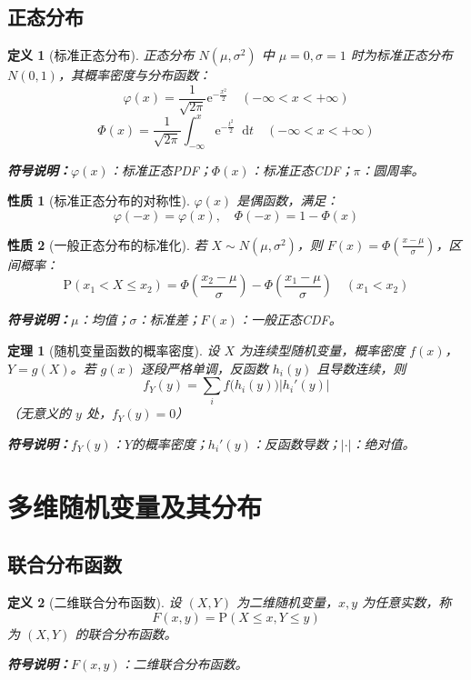 \documentclass{article}
\newcommand{\Prob}{\mathrm{P}}
\newcommand{\dif}{\mathop{}\!\mathrm{d}}
\newcommand{\e}{\mathrm{e}}
\newcommand{\symnote}[1]{\par\noindent\textbf{符号说明：}#1\par}
\theoremstyle{mytheorem}
\newtheorem{theorem}{定理}[section]
\newtheorem{definition}{定义}[section]
\newtheorem{property}{性质}[section]
\begin{document}
\subsection{正态分布}
\begin{definition}[标准正态分布]
正态分布 $N(\mu,\sigma^2)$ 中 $\mu=0, \sigma=1$ 时为标准正态分布 $N(0,1)$，其概率密度与分布函数：
$$
\varphi(x)=\frac{1}{\sqrt{2\pi}} \e^{-\frac{x^2}{2}} \quad (-\infty < x < +\infty)
$$
$$
\Phi(x)=\frac{1}{\sqrt{2\pi}} \int_{-\infty}^{x} \e^{-\frac{t^2}{2}} \dif t \quad (-\infty < x < +\infty)
$$
\symnote{$\varphi(x)$：标准正态PDF；$\Phi(x)$：标准正态CDF；$\pi$：圆周率。}
\end{definition}

\begin{property}[标准正态分布的对称性]
$\varphi(x)$ 是偶函数，满足：
$$
\varphi(-x)=\varphi(x), \quad \Phi(-x)=1-\Phi(x)
$$
\end{property}

\begin{property}[一般正态分布的标准化]
若 $X \sim N(\mu,\sigma^2)$，则 $F(x)=\Phi\left( \frac{x-\mu}{\sigma} \right)$，区间概率：
$$
\Prob(x_1 < X \leq x_2)=\Phi\left( \frac{x_2-\mu}{\sigma} \right)-\Phi\left( \frac{x_1-\mu}{\sigma} \right) \quad (x_1 < x_2)
$$
\symnote{$\mu$：均值；$\sigma$：标准差；$F(x)$：一般正态CDF。}
\end{property}

\begin{theorem}[随机变量函数的概率密度]
设 $X$ 为连续型随机变量，概率密度 $f(x)$，$Y = g(X)$。若 $g(x)$ 逐段严格单调，反函数 $h_i(y)$ 且导数连续，则
$$
f_Y(y) = \sum_{i} f\bigl(h_i(y)\bigr)\left|h_i'(y)\right|
$$
（无意义的 $y$ 处，$f_Y(y)=0$）
\symnote{$f_Y(y)$：$Y$的概率密度；$h_i'(y)$：反函数导数；$|\cdot|$：绝对值。}
\end{theorem}

\section{多维随机变量及其分布}
\subsection{联合分布函数}
\begin{definition}[二维联合分布函数]
设 $(X,Y)$ 为二维随机变量，$x,y$ 为任意实数，称
$$
F(x,y) = \Prob(X \leq x, Y \leq y)
$$
为 $(X,Y)$ 的联合分布函数。
\symnote{$F(x,y)$：二维联合分布函数。}
\end{definition}
\end{document}
